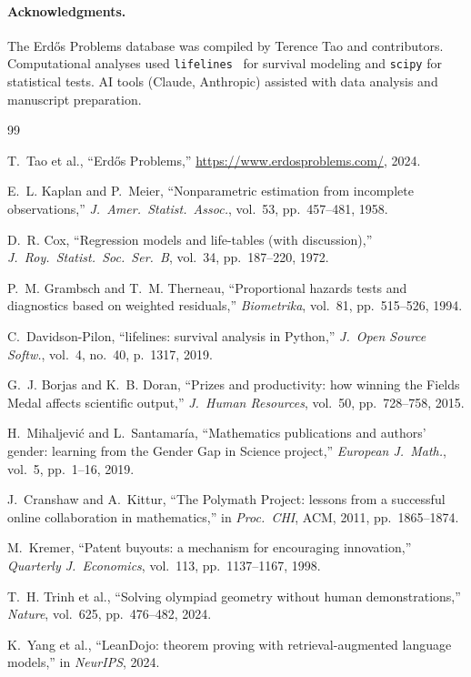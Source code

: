 \documentclass[11pt]{article}
\begin{document}
\paragraph{Acknowledgments.}
The Erd\H{o}s Problems database was compiled by Terence Tao and
contributors. Computational analyses used
\texttt{lifelines}~\cite{davidson-pilon2019} for survival modeling
and \texttt{scipy} for statistical tests. AI tools (Claude, Anthropic)
assisted with data analysis and manuscript preparation.


\begingroup
\raggedright
\begin{thebibliography}{99}

T.~Tao et al.,
``Erd\H{o}s Problems,''
\url{https://www.erdosproblems.com/}, 2024.

E.~L. Kaplan and P.~Meier,
``Nonparametric estimation from incomplete observations,''
\emph{J.\ Amer.\ Statist.\ Assoc.}, vol.~53, pp.~457--481, 1958.

D.~R. Cox,
``Regression models and life-tables (with discussion),''
\emph{J.\ Roy.\ Statist.\ Soc.\ Ser.~B}, vol.~34, pp.~187--220, 1972.

P.~M. Grambsch and T.~M. Therneau,
``Proportional hazards tests and diagnostics based on weighted residuals,''
\emph{Biometrika}, vol.~81, pp.~515--526, 1994.

C.~Davidson-Pilon,
``lifelines: survival analysis in Python,''
\emph{J.\ Open Source Softw.}, vol.~4, no.~40, p.~1317, 2019.

G.~J. Borjas and K.~B. Doran,
``Prizes and productivity: how winning the Fields Medal affects
scientific output,''
\emph{J.\ Human Resources}, vol.~50, pp.~728--758, 2015.

H.~Mihaljevi\'{c} and L.~Santamar\'{i}a,
``Mathematics publications and authors' gender:
learning from the Gender Gap in Science project,''
\emph{European J.\ Math.}, vol.~5, pp.~1--16, 2019.

J.~Cranshaw and A.~Kittur,
``The Polymath Project: lessons from a successful online
collaboration in mathematics,''
in \emph{Proc.\ CHI}, ACM, 2011, pp.~1865--1874.

M.~Kremer,
``Patent buyouts: a mechanism for encouraging innovation,''
\emph{Quarterly J.\ Economics}, vol.~113, pp.~1137--1167, 1998.

T.~H. Trinh et al.,
``Solving olympiad geometry without human demonstrations,''
\emph{Nature}, vol.~625, pp.~476--482, 2024.

K.~Yang et al.,
``LeanDojo: theorem proving with retrieval-augmented language models,''
in \emph{NeurIPS}, 2024.

\end{thebibliography}
\endgroup
\end{document}
